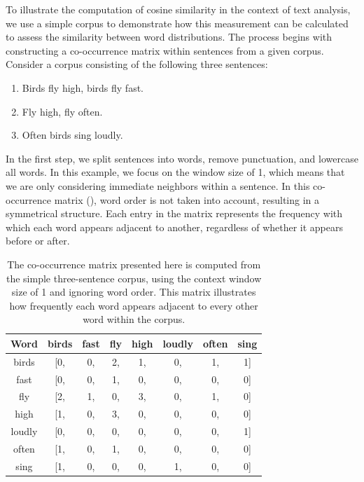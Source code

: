 To illustrate the computation of cosine similarity in the context of text analysis, we use a simple corpus to demonstrate how this measurement can be calculated to assess the similarity between word distributions. The process begins with constructing a co-occurrence matrix within sentences
from a given corpus. Consider a corpus consisting of the following three sentences:

\begin{enumerate}
    \item Birds fly high, birds fly fast.
    \item Fly high, fly often.
    \item Often birds sing loudly.
\end{enumerate}

In the first step, we split sentences into words, remove punctuation, and lowercase all words. In this example, we focus on the window size of 1, which means that we are only considering immediate neighbors within a sentence. In this co-occurrence matrix  (), word order is not taken into account, resulting in a symmetrical structure. Each entry in the matrix represents the frequency with which each word appears adjacent to another, regardless of whether it appears before or after. 

\begin{table}[h]
\centering
\begin{tabular}{|c|ccccccc|}
\hline
\textbf{Word} & \textbf{birds} & \textbf{fast} & \textbf{fly} & \textbf{high} & \textbf{loudly} & \textbf{often} & \textbf{sing} \\
\hline
birds  & [0, & 0, & 2, & 1, & 0, & 1, & 1] \\
fast   & [0, & 0, & 1, & 0, & 0, & 0, & 0] \\
fly    & [2, & 1, & 0, & 3, & 0, & 1, & 0] \\
high   & [1, & 0, & 3, & 0, & 0, & 0, & 0] \\
loudly & [0, & 0, & 0, & 0, & 0, & 0, & 1] \\
often  & [1, & 0, & 1, & 0, & 0, & 0, & 0] \\
sing   & [1, & 0, & 0, & 0, & 1, & 0, & 0] \\
\hline
\end{tabular}

\caption{The co-occurrence matrix presented here is computed from the simple three-sentence corpus, using the context window size of 1 and ignoring word order. This matrix illustrates how frequently each word appears adjacent to every other word within the corpus.}

\label{table:distribution-semantics}
\end{table}

